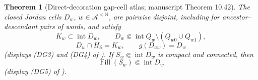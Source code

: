 \documentclass[11pt,reqno]{amsart}
\newtheorem{theorem}{Theorem}[section]
\theoremstyle{definition}
\theoremstyle{remark}
\newcommand{\Fill}{\operatorname{Fill}}
\newcommand{\Int}{\operatorname{int}}
\begin{document}
\begin{theorem}[Direct-decoration gap-cell atlas; manuscript
Theorem 10.42]\label{thm:gap-cells}
The closed Jordan cells $D_w$, $w\in\mathcal A^{<\mathbb N}$, are
pairwise disjoint, including for ancestor--descendant pairs of words, and
satisfy
\begin{equation}\label{eq:F-cell-position}
K_w\subset\Int D_w,
\qquad
D_w\Subset\Int Q_w\setminus(Q_{w0}\cup Q_{w1}),
\end{equation}
\begin{equation}\label{eq:F-cell-isolation}
D_w\cap H_\partial=K_w,
\qquad
g(D_{aw})=D_w
\end{equation}
(displays (DG3) and (DG4) of \cite{MWman}).  If
$S_w\Subset\Int D_w$ is compact and connected, then
\begin{equation}\label{eq:F-cell-fill}
\Fill(S_w)\Subset\Int D_w
\end{equation}
(display (DG5) of \cite{MWman}).
\end{theorem}
\end{document}
